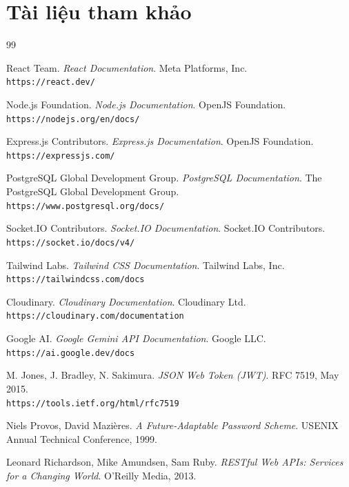 \chapter{Tài liệu tham khảo}

\begin{thebibliography}{99}

React Team. \textit{React Documentation}. Meta Platforms, Inc. \\
\texttt{https://react.dev/}

Node.js Foundation. \textit{Node.js Documentation}. OpenJS Foundation. \\
\texttt{https://nodejs.org/en/docs/}

Express.js Contributors. \textit{Express.js Documentation}. OpenJS Foundation. \\
\texttt{https://expressjs.com/}

PostgreSQL Global Development Group. \textit{PostgreSQL Documentation}. The PostgreSQL Global Development Group. \\
\texttt{https://www.postgresql.org/docs/}


Socket.IO Contributors. \textit{Socket.IO Documentation}. Socket.IO Contributors. \\
\texttt{https://socket.io/docs/v4/}

Tailwind Labs. \textit{Tailwind CSS Documentation}. Tailwind Labs, Inc. \\
\texttt{https://tailwindcss.com/docs}

Cloudinary. \textit{Cloudinary Documentation}. Cloudinary Ltd. \\
\texttt{https://cloudinary.com/documentation}

Google AI. \textit{Google Gemini API Documentation}. Google LLC. \\
\texttt{https://ai.google.dev/docs}

M. Jones, J. Bradley, N. Sakimura. \textit{JSON Web Token (JWT)}. RFC 7519, May 2015. \\
\texttt{https://tools.ietf.org/html/rfc7519}

Niels Provos, David Mazières. \textit{A Future-Adaptable Password Scheme}. USENIX Annual Technical Conference, 1999.

Leonard Richardson, Mike Amundsen, Sam Ruby. \textit{RESTful Web APIs: Services for a Changing World}. O'Reilly Media, 2013.


\end{thebibliography}

